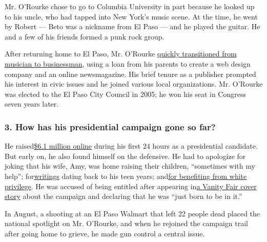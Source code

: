 Mr. O'Rourke chose to go to Columbia University in part because he
looked up to his uncle, who had tapped into New York's music scene. At
the time, he went by Robert --- Beto was a nickname from El Paso --- and
he played the guitar. He and a few of his friends formed a punk rock
group.

After returning home to El Paso, Mr. O'Rourke
\href{https://www.nytimes.com/2019/04/26/us/politics/beto-o-rourke-el-paso-texas.html}{quickly
transitioned from musician to businessman}, using a loan from his
parents to create a web design company and an online newsmagazine. His
brief tenure as a publisher prompted his interest in civic issues and he
joined various local organizations. Mr. O'Rourke was elected to the El
Paso City Council in 2005; he won his seat in Congress seven years
later.

\hypertarget{3-how-has-his-presidential-campaign-gone-so-far}{%
\subsubsection{\texorpdfstring{\textbf{3. How has his presidential
campaign gone so
far?}}{3. How has his presidential campaign gone so far?}}\label{3-how-has-his-presidential-campaign-gone-so-far}}

He
raised\href{https://www.nytimes.com/2019/03/18/us/politics/beto-o-rourke-fundraising.html}{}\href{https://www.nytimes.com/2019/03/18/us/politics/beto-o-rourke-fundraising.html}{\$6.1
million online} during his first 24 hours as a presidential candidate.
But early on, he also found himself on the defensive. He had to
apologize for joking that his wife, Amy, was home raising their
children, ``sometimes with my help'';
for\href{https://www.cnn.com/2019/03/15/politics/beto-orourke-wife-white-privilege/index.html}{}\href{https://www.cnn.com/2019/03/15/politics/beto-orourke-wife-white-privilege/index.html}{writings}
dating back to his teen years;
and\href{https://www.cnn.com/2019/03/15/politics/beto-orourke-wife-white-privilege/index.html}{}\href{https://www.cnn.com/2019/03/15/politics/beto-orourke-wife-white-privilege/index.html}{for
benefiting from white privilege}. He was accused of being entitled after
appearing
in\href{https://www.vanityfair.com/news/2019/03/beto-orourke-cover-story}{}\href{https://www.vanityfair.com/news/2019/03/beto-orourke-cover-story}{a
Vanity Fair cover story} about the campaign and declaring that he was
``just born to be in it.''

In August, a shooting at an El Paso Walmart that left 22 people dead
placed the national spotlight on Mr. O'Rourke, and when he rejoined the
campaign trail after going home to grieve, he made gun control a central
issue.


